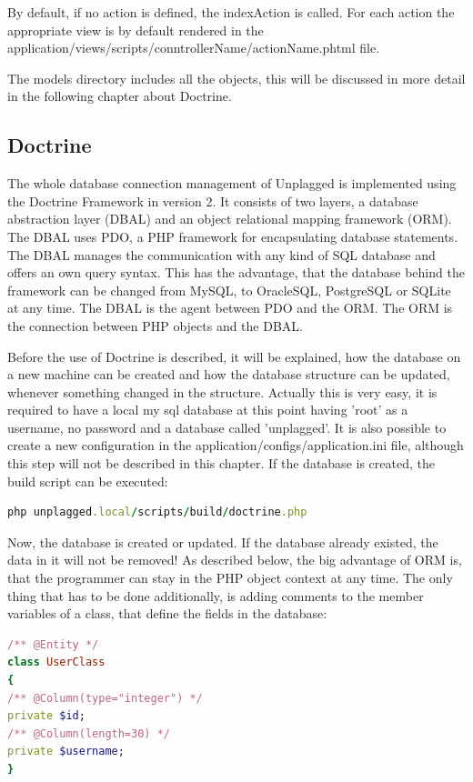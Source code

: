 By default, if no action is defined, the indexAction is called. For each action the appropriate view is by default rendered in the application/views/scripts/conntrollerName/actionName.phtml file.

The models directory includes all the objects, this will be discussed in more detail in the following chapter about Doctrine.

\subsection{Doctrine}
The whole database connection management of Unplagged is implemented using the Doctrine Framework in version 2. 
It consists of two layers, a database abstraction layer (DBAL) and an object relational mapping framework
(ORM). The DBAL uses PDO, a PHP framework for encapsulating database statements. The DBAL manages the
communication with any kind of SQL database and offers an own query syntax. This has the advantage, that
the database behind the framework can be changed from MySQL, to OracleSQL, PostgreSQL or SQLite at any time.
The DBAL is the agent between PDO and the ORM. The ORM is the connection between PHP objects and the DBAL.

Before the use of Doctrine is described, it will be explained, how the database on a new machine can be created and how the database structure can be updated, whenever something changed in the structure. Actually this is very easy, it is required to have a local my sql database at this point having 'root' as a username, no password and a database called 'unplagged'. It is also possible to create a new configuration in the application/configs/application.ini file, although this step will not be described in this chapter. If the database is created, the build script can be executed:

\begin{lstlisting}[caption=Updating database structure, label=list:updatingDbStructure, language=Ruby]
php unplagged.local/scripts/build/doctrine.php
\end{lstlisting}

Now, the database is created or updated. If the database already existed, the data in it will not be removed! As described below, the big advantage of ORM is, that the programmer can stay in the PHP object context at any time. The only thing that has to be done additionally, is adding
comments to the member variables of a class, that define the fields in the database:

\begin{lstlisting}[caption=Defining a class in Doctrine, label=list:definingClassDoctrine, language=Ruby]
/** @Entity */
class UserClass
{
/** @Column(type="integer") */
private $id;
/** @Column(length=30) */
private $username;
}
\end{lstlisting}

